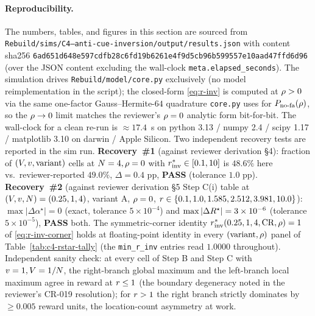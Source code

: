 \paragraph{Reproducibility.}
The numbers, tables, and figures in this section are sourced from
\texttt{Rebuild/sims/C4--anti-cue-inversion/output/results.json} with
content sha256 \texttt{6ad651d6\linebreak[0]48e597cdfb28c6fd19b6261e4f9d5cb96b599557e10aad47ffd6d96}
(over the JSON content excluding the wall-clock
\texttt{meta.elapsed\_seconds}). The simulation drives
\texttt{Rebuild/model/core.py} exclusively (no model
reimplementation in the script); the closed-form \eqref{eq:r-inv}
is computed at $\rho > 0$ via the same one-factor
Gauss--Hermite-$64$ quadrature \texttt{core.py} uses for
$P_{\mathrm{no\text{-}fa}}(\rho)$, so the $\rho \to 0$ limit matches the reviewer's
$\rho = 0$ analytic form bit-for-bit. The wall-clock for a clean
re-run is $\approx 17.4$~s on python 3.13 / numpy 2.4 / scipy 1.17
/ matplotlib 3.10 on darwin / Apple Silicon. Two independent
recovery tests are reported in the sim run. \textbf{Recovery~\#1}
(against reviewer derivation §4): fraction of $(V, v,
\text{variant})$ cells at $N = 4, \rho = 0$ with $r^{*}_{\mathrm{inv}} \in
[0.1, 10]$ is $48.6\%$ here vs.\ reviewer-reported $49.0\%$,
$\Delta = 0.4$ pp, \textbf{PASS} (tolerance $1.0$ pp).
\textbf{Recovery~\#2} (against reviewer derivation §5 Step C(i)
table at $(V, v, N) = (0.25, 1, 4)$, variant A,
$\rho = 0$, $r \in \{0.1, 1.0, 1.585, 2.512, 3.981, 10.0\}$):
$\max|\Delta\alpha^\star| = 0$ (exact, tolerance $5 \times 10^{-4}$)
and $\max|\Delta R^\star| = 3 \times 10^{-6}$ (tolerance
$5 \times 10^{-5}$), \textbf{PASS} both. The
symmetric-corner identity $r^{*}_{\mathrm{inv}}(0.25, 1, 4, \mathrm{CR}, \rho) = 1$
of \eqref{eq:r-inv-corner} holds at floating-point identity in
every $(\text{variant}, \rho)$ panel of
Table~\ref{tab:c4-rstar-tally} (the \texttt{min\_r\_inv} entries
read $1.0000$ throughout). Independent sanity check: at every cell
of Step B and Step C with $v = 1, V = 1/N$, the
right-branch global maximum and the left-branch local maximum agree
in reward at $r \le 1$ (the boundary degeneracy noted in the
reviewer's CR-019 resolution); for $r > 1$ the right branch
strictly dominates by $\ge 0.005$ reward units, the location-count
asymmetry at work.
